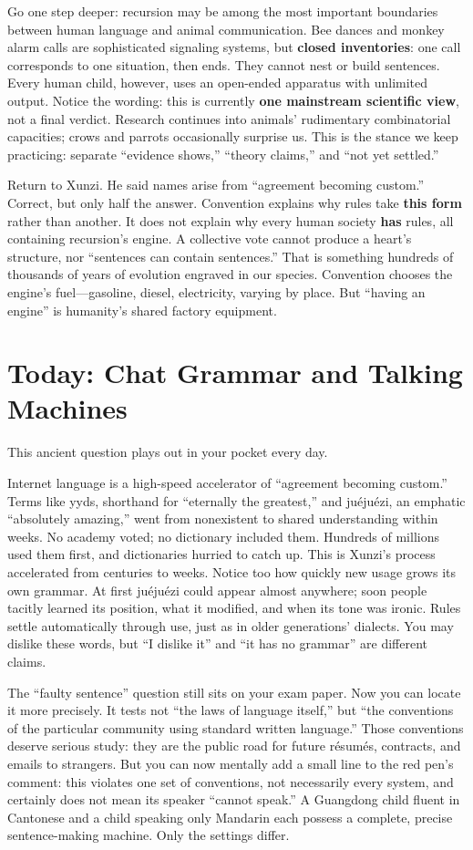 Go one step deeper: recursion may be among the most important boundaries between human language and animal communication. Bee dances and monkey alarm calls are sophisticated signaling systems, but \textbf{closed inventories}: one call corresponds to one situation, then ends. They cannot nest or build sentences. Every human child, however, uses an open-ended apparatus with unlimited output. Notice the wording: this is currently \textbf{one mainstream scientific view}, not a final verdict. Research continues into animals' rudimentary combinatorial capacities; crows and parrots occasionally surprise us. This is the stance we keep practicing: separate ``evidence shows,'' ``theory claims,'' and ``not yet settled.''

Return to Xunzi. He said names arise from ``agreement becoming custom.'' Correct, but only half the answer. Convention explains why rules take \textbf{this form} rather than another. It does not explain why every human society \textbf{has} rules, all containing recursion's engine. A collective vote cannot produce a heart's structure, nor ``sentences can contain sentences.'' That is something hundreds of thousands of years of evolution engraved in our species. Convention chooses the engine's fuel---gasoline, diesel, electricity, varying by place. But ``having an engine'' is humanity's shared factory equipment.

\section{Today: Chat Grammar and Talking Machines}
This ancient question plays out in your pocket every day.

Internet language is a high-speed accelerator of ``agreement becoming custom.'' Terms like yyds, shorthand for ``eternally the greatest,'' and juéjuézi, an emphatic ``absolutely amazing,'' went from nonexistent to shared understanding within weeks. No academy voted; no dictionary included them. Hundreds of millions used them first, and dictionaries hurried to catch up. This is Xunzi's process accelerated from centuries to weeks. Notice too how quickly new usage grows its own grammar. At first juéjuézi could appear almost anywhere; soon people tacitly learned its position, what it modified, and when its tone was ironic. Rules settle automatically through use, just as in older generations' dialects. You may dislike these words, but ``I dislike it'' and ``it has no grammar'' are different claims.

The ``faulty sentence'' question still sits on your exam paper. Now you can locate it more precisely. It tests not ``the laws of language itself,'' but ``the conventions of the particular community using standard written language.'' Those conventions deserve serious study: they are the public road for future résumés, contracts, and emails to strangers. But you can now mentally add a small line to the red pen's comment: this violates one set of conventions, not necessarily every system, and certainly does not mean its speaker ``cannot speak.'' A Guangdong child fluent in Cantonese and a child speaking only Mandarin each possess a complete, precise sentence-making machine. Only the settings differ.

